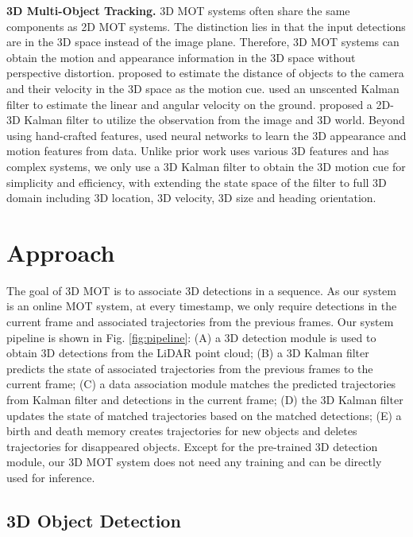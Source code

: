 \documentclass[letterpaper, 10 pt, conference]{ieeeconf}
\begin{document}
\vspace{1.5mm}\noindent\textbf{3D Multi-Object Tracking.} 3D MOT systems often share the same components as 2D MOT systems. The distinction lies in that the input detections are in the 3D space instead of the image plane. Therefore, 3D MOT systems can obtain the motion and appearance information in the 3D space without perspective distortion. \cite{Scheidegger2018} proposed to estimate the distance of objects to the camera and their velocity in the 3D space as the motion cue. \cite{Patil2019} used an unscented Kalman filter to estimate the linear and angular velocity on the ground. \cite{Osep2017} proposed a 2D-3D Kalman filter to utilize the observation from the image and 3D world. Beyond using hand-crafted features, \cite{Zhang2019, Weng2020_gnn3dmot, Weng2020_gnntrkforecast, Wang2020_gnndettrk} used neural networks to learn the 3D appearance and motion features from data. Unlike prior work uses various 3D features and has complex systems, we only use a 3D Kalman filter to obtain the 3D motion cue for simplicity and efficiency, with extending the state space of the filter to full 3D domain including 3D location, 3D velocity, 3D size and heading orientation.




\vspace{-0.1cm}
\section{Approach}

The goal of 3D MOT is to associate 3D detections in a sequence. As our system is an online MOT system, at every timestamp, we only require detections in the current frame and associated trajectories from the previous frames. Our system pipeline is shown in Fig. \ref{fig:pipeline}: (A) a 3D detection module is used to obtain 3D detections from the LiDAR point cloud; (B) a 3D Kalman filter predicts the state of associated trajectories from the previous frames to the current frame; (C) a data association module matches the predicted trajectories from Kalman filter and detections in the current frame; (D) the 3D Kalman filter updates the state of matched trajectories based on the matched detections; (E) a birth and death memory creates trajectories for new objects and deletes trajectories for disappeared objects. Except for the pre-trained 3D detection module, our 3D MOT system does not need any training and can be directly used for inference.

\subsection{3D Object Detection}
\end{document}
